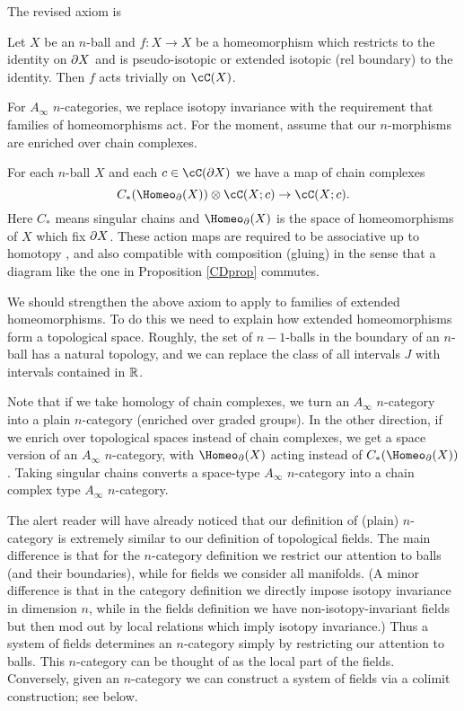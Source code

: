 The revised axiom is

{Let $X$ be an $n$-ball and $f: X\to X$ be a homeomorphism which restricts
to the identity on $\partial X$ and is pseudo-isotopic or extended isotopic (rel boundary) to the identity.
Then $f$ acts trivially on $\cC(X)$.}


\smallskip

For $A_\infty$ $n$-categories, we replace
isotopy invariance with the requirement that families of homeomorphisms act.
For the moment, assume that our $n$-morphisms are enriched over chain complexes.

{For each $n$-ball $X$ and each $c\in \cC(\bd X)$ we have a map of chain complexes
\[
	C_*(\Homeo_\bd(X))\ot \cC(X; c) \to \cC(X; c) .
\]
Here $C_*$ means singular chains and $\Homeo_\bd(X)$ is the space of homeomorphisms of $X$
which fix $\partial X$.
These action maps are required to be associative up to homotopy
, and also compatible with composition (gluing) in the sense that
a diagram like the one in Proposition \ref{CDprop} commutes.
}

We should strengthen the above axiom to apply to families of extended homeomorphisms.
To do this we need to explain how extended homeomorphisms form a topological space.
Roughly, the set of $n{-}1$-balls in the boundary of an $n$-ball has a natural topology,
and we can replace the class of all intervals $J$ with intervals contained in $\mathbb{R}$.

Note that if we take homology of chain complexes, we turn an $A_\infty$ $n$-category
into a plain $n$-category (enriched over graded groups).
In the other direction, if we enrich over topological spaces instead of chain complexes,
we get a space version of an $A_\infty$ $n$-category, with $\Homeo_\bd(X)$ acting 
instead of  $C_*(\Homeo_\bd(X))$.
Taking singular chains converts a space-type $A_\infty$ $n$-category into a chain complex
type $A_\infty$ $n$-category.

\medskip

The alert reader will have already noticed that our definition of (plain) $n$-category
is extremely similar to our definition of topological fields.
The main difference is that for the $n$-category definition we restrict our attention to balls
(and their boundaries), while for fields we consider all manifolds.
(A minor difference is that in the category definition we directly impose isotopy
invariance in dimension $n$, while in the fields definition we have non-isotopy-invariant fields
but then mod out by local relations which imply isotopy invariance.)
Thus a system of fields determines an $n$-category simply by restricting our attention to
balls.
This $n$-category can be thought of as the local part of the fields.
Conversely, given an $n$-category we can construct a system of fields via 
a colimit construction; see below.


